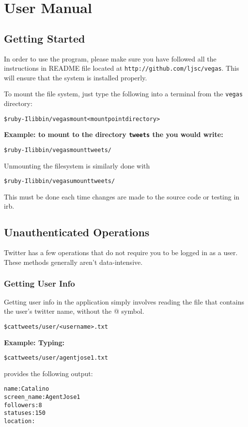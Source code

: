 \section{User Manual}\label{sec:usermanual}

\subsection{Getting Started}
In order to use the program, please make sure you have followed all the instructions in README file located at \texttt{http://github.com/ljsc/vegas}. This will ensure that the system is installed properly.

To mount the file system, just type the following into a terminal from the \texttt{vegas} directory:
\begin{alltt}
    \$ ruby -Ilib bin/vegas mount <mountpoint directory>
\end{alltt}
\bf{Example:} to mount to the directory \texttt{tweets} the you would write:
\begin{alltt}
    \$ ruby -Ilib bin/vegas mount tweets/
\end{alltt}
Unmounting the filesystem is similarly done with 
\begin{alltt}
    \$ ruby -Ilib bin/vegas umount tweets/
\end{alltt}
This must be done each time changes are made to the source code or testing in irb. 

\subsection{Unauthenticated Operations}
Twitter has a few operations that do not require you to be logged in as a user. These methods generally aren't data-intensive. 
\subsubsection{Getting User Info}\label{userinfo}
Getting user info in the application simply involves reading the file that contains the user's twitter name, without the @ symbol.\\
\begin{alltt}
    \$ cat tweets/user/<username>.txt
\end{alltt}
\bf{Example:}
Typing: 
\begin{alltt}
    \$ cat tweets/user/agentjose1.txt
\end{alltt}
provides the following output:
\begin{alltt}
   name: Catalino
   screen_name: AgentJose1
   followers: 8
   statuses: 150
   location: 
\end{alltt}
